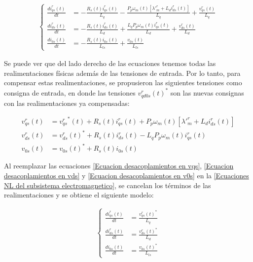 \documentclass[a4paper, 10pt, onecolumn,journal]{ieeeconf}
\begin{document}
\begin{align}
	\begin{cases}
		\frac{d i^r_{qs}(t)}{dt} &= -\frac{R_s(t) i^r_{qs}(t)}{L_q} - \frac{P_p \omega_m(t) \left[\lambda'^r_m + L_d i^r_{ds}(t)\right]}{L_q} + \frac{v^r_{qs}(t)}{L_q}\\
		\frac{d i^r_{ds}(t)}{dt} &= -\frac{R_s(t) i^r_{ds}(t)}{L_d} + \frac{L_q P_p \omega_m(t)i^r_{qs}(t)}{L_d}  + \frac{v^r_{ds}(t)}{L_d} \\ 
		\frac{d i_{0s}(t)}{dt}   &= -\frac{R_s(t) i_{0s}(t)}{L_{ls}} + \frac{v_{0s}(t)}{L_{ls}}
	\end{cases}	\label{Ecuaciones NL del subsistema electromagnetico}
\end{align}

Se puede ver que del lado derecho de las ecuaciones tenemos todas las realimentaciones físicas además de las tensiones de entrada. Por lo tanto, para compensar estas realimentaciones, se propusieron las siguientes tensiones como consigna de entrada, en donde las tensiones  ${v^r_{qd0s}(t)}^*$ son las nuevas consignas con las realimentaciones ya compensadas:
 
 \begin{align}
 	v^r_{qs}(t) &= {v^r_{qs}}^*(t) + R_s(t) i^r_{qs}(t) + P_p \omega_m(t) \left[\lambda'^r_m + L_d i^r_{ds}(t)\right] \label{Ecuacion desacoplamientos en vqs}\\
 	v^r_{ds}(t) &= {v^r_{ds}(t)}^* + R_s(t) i^r_{ds}(t) - L_q P_p \omega_m(t)i^r_{qs}(t) \label{Ecuacion desacoplamientos en vds}\\ 
 	v_{0s}(t)   &= {v_{0s}(t)}^* + R_s(t) i_{0s}(t) \label{Ecuacion desacoplamientos en v0s}
 \end{align}

Al reemplazar las ecuaciones \eqref{Ecuacion desacoplamientos en vqs}, \eqref{Ecuacion desacoplamientos en vds} y \eqref{Ecuacion desacoplamientos en v0s} en la \cref{Ecuaciones NL del subsistema electromagnetico}, se cancelan los términos de las realimentaciones y se obtiene el siguiente modelo:

\begin{align}
	\begin{cases}
		\frac{d i^r_{qs}(t)}{dt} &= \frac{{v^r_{qs}(t)}^*}{L_q}\\
		\frac{d i^r_{ds}(t)}{dt} &= \frac{{v^r_{ds}(t)}^*}{L_d} \\ 
		\frac{d i_{0s}(t)}{dt}   &= \frac{{v_{0s}(t)}^*}{L_{ls}}
	\end{cases}	\label{Ecuaciones del subsistema electromagnetico sin realimentaciones fisicas}
\end{align}
\end{document}
